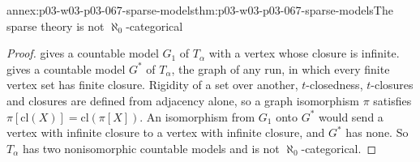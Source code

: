 \begin{annexitem}{annex:p03-w03-p03-067-sparse-models}{thm:p03-w03-p03-067-sparse-models}{The sparse theory is not \(\aleph_0\)-categorical}
\begin{proof}
 gives a countable model \(G_1\)
of \(T_\alpha\) with a vertex whose closure is infinite.
 gives a countable model \(G^\ast\) of
\(T_\alpha\), the graph of any run, in which every finite vertex set has
finite closure.  Rigidity of a set over another, \(t\)-closedness,
\(t\)-closures and closures are defined from adjacency alone, so a graph
isomorphism \(\pi\) satisfies \(\pi[\mathrm{cl}(X)]=\mathrm{cl}(\pi[X])\).
An isomorphism from \(G_1\) onto \(G^\ast\) would send a vertex with
infinite closure to a vertex with infinite closure, and \(G^\ast\) has none.
So \(T_\alpha\) has two nonisomorphic countable models and is not
\(\aleph_0\)-categorical.
\end{proof}
\end{annexitem}
